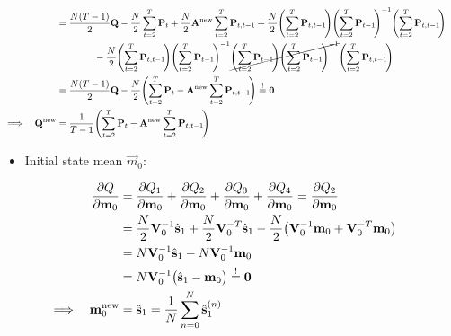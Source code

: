 \begin{align}
		&&	&= \frac{N(T - 1)}{2} \mat{Q} - \frac{N}{2} \sum_{t = 2}^{T} \mat{P}_t + \frac{N}{2} \mat{A}^\new \sum_{t = 2}^{T} \mat{P}_{t, t - 1} + \frac{N}{2} \Bigg(\! \sum_{t = 2}^{T} \mat{P}_{t, t - 1} \!\Bigg) \Bigg(\! \sum_{t = 2}^{T} \mat{P}_{t - 1} \!\Bigg)^{-1} \Bigg(\! \sum_{t = 2}^{T} \mat{P}_{t, t - 1} \!\Bigg) & \nonumber \\
			&&	&\qquad\qquad - \frac{N}{2} \Bigg(\! \sum_{t = 2}^{T} \mat{P}_{t, t - 1} \!\Bigg) \Bigg(\! \sum_{t = 2}^{T} \mat{P}_{t - 1} \!\Bigg)^{-1} \cancel{\Bigg(\! \sum_{t = 2}^{T} \mat{P}_{t - 1} \!\Bigg) \Bigg(\! \sum_{t = 2}^{T} \mat{P}_{t - 1} \!\Bigg)^{-1}} \Bigg(\! \sum_{t = 2}^{T} \mat{P}_{t, t - 1} \!\Bigg) & \nonumber \\
		&&	&= \frac{N(T - 1)}{2} \mat{Q} - \frac{N}{2} \Bigg(\! \sum_{t = 2}^{T} \mat{P}_t - \mat{A}^\new \sum_{t = 2}^{T} \mat{P}_{t, t - 1} \!\Bigg) \overset{!}{=} \mat{0} & \nonumber \\
		\implies && \mat{Q}^\new &= \frac{1}{T - 1} \Bigg(\! \sum_{t = 2}^{T} \mat{P}_t - \mat{A}^\new \sum_{t = 2}^{T} \mat{P}_{t, t - 1} \!\Bigg) & \label{eq:stateNoiseCovariance}
	\end{align}

	\begin{itemize}
		\item Initial state mean \(\vec{m}_0\):
	\end{itemize}
	\begin{align}
		&&\pdv{Q}{\boldsymbol{\mathrm{m}}_0}
			&= \pdv{Q_1}{\boldsymbol{\mathrm{m}}_0} + \pdv{Q_2}{\boldsymbol{\mathrm{m}}_0} + \pdv{Q_3}{\boldsymbol{\mathrm{m}}_0} + \pdv{Q_4}{\boldsymbol{\mathrm{m}}_0} = \pdv{Q_2}{\boldsymbol{\mathrm{m}}_0} & \nonumber \\
		&&	&= \frac{N}{2} \boldsymbol{\mathrm{V}}_0^{-1} \hat{\boldsymbol{\mathrm{s}}}_1 + \frac{N}{2} \boldsymbol{\mathrm{V}}_0^{-T} \hat{\boldsymbol{\mathrm{s}}}_1 - \frac{N}{2} \big( \boldsymbol{\mathrm{V}}_0^{-1} \boldsymbol{\mathrm{m}}_0 + \boldsymbol{\mathrm{V}}_0^{-T} \boldsymbol{\mathrm{m}}_0 \big) & \nonumber \\
		&&	&= N \boldsymbol{\mathrm{V}}_0^{-1} \hat{\boldsymbol{\mathrm{s}}}_1 - N \boldsymbol{\mathrm{V}}_0^{-1} \boldsymbol{\mathrm{m}}_0 & \nonumber \\
		&&	&= N \boldsymbol{\mathrm{V}}_0^{-1} \big( \hat{\boldsymbol{\mathrm{s}}}_1 - \boldsymbol{\mathrm{m}}_0 \big) \overset{!}{=} \boldsymbol{\mathrm{0}} & \nonumber \\
		\implies && \boldsymbol{\mathrm{m}}_0^{\mathrm{new}} &= \hat{\boldsymbol{\mathrm{s}}}_1 = \frac{1}{N} \sum_{n = 0}^{N} \hat{\boldsymbol{\mathrm{s}}}_1^{(n)} & \label{eq:initialStateMean}
	\end{align}
	
